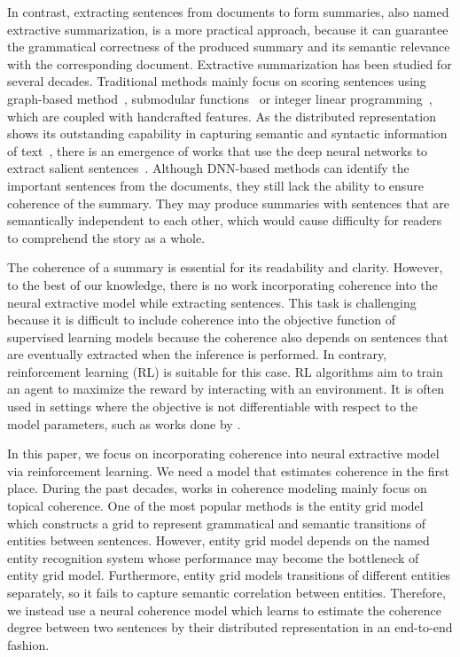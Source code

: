	In contrast, extracting sentences from documents to form summaries, also named extractive summarization, is a more practical approach, because it can guarantee the grammatical correctness of the produced summary and its semantic relevance with the corresponding document. Extractive summarization has been studied for several decades. Traditional methods mainly focus on scoring sentences using graph-based method~\cite{graph_based}, submodular functions~\cite{lin_class_2011} or integer linear programming~\cite{ilp}, which are coupled with handcrafted features. As the distributed representation shows its outstanding capability in capturing semantic and syntactic information of text~\cite{word2vec,DNV}, there is an emergence of works that use the deep neural networks to extract salient sentences~\cite{jianpeng2016,SummaRuNNer}. Although DNN-based methods can identify the important sentences from the documents, they still lack the ability to ensure coherence of the summary. They may produce summaries with sentences that are semantically independent to each other, which would cause difficulty for readers to comprehend the story as a whole. 

	The coherence of a summary is essential for its readability and clarity. However, to the best of our knowledge, there is no work incorporating coherence into the neural extractive model while extracting sentences. This task is challenging because it is difficult to include coherence into the objective function of supervised learning models because the coherence also depends on sentences that are eventually extracted when the inference is performed. In contrary, reinforcement learning (RL) is suitable for this case. RL algorithms aim to train an agent to maximize the reward by interacting with an environment. It is often used in settings where the objective is not differentiable with respect to the model parameters, such as works done by \cite{socher2017_summarization,rl2nmt}.

	In this paper, we focus on incorporating coherence into neural extractive model via reinforcement learning. We need a model that estimates coherence in the first place. During the past decades, works in coherence modeling mainly focus on topical coherence. One of the most popular methods is the entity grid model~\cite{entitygrid} which constructs a grid to represent grammatical and semantic transitions of entities between sentences. However, entity grid model depends on the named entity recognition system whose performance may become the bottleneck of entity grid model. Furthermore, entity grid models transitions of different entities separately, so it fails to capture semantic correlation between entities. Therefore, we instead use a neural coherence model which learns to estimate the coherence degree between two sentences by their distributed representation in an end-to-end fashion. 

